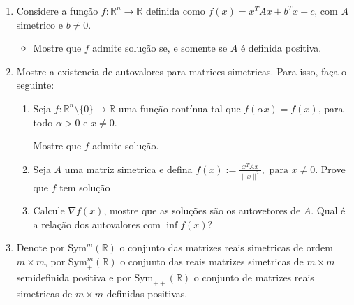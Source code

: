 \documentclass[a4paper,latin]{article}
\begin{document}
    \begin{enumerate}
    \item Considere a função 
    $f: \mathbb{R}^{n}\rightarrow \mathbb{R}$ definida como 
    $f(x)=x^{T}Ax+b^{T}x+c$, com  $A$ simetrico e $b\neq 0$.
      \begin{itemize}
      \item  
      Mostre que $f$ admite solução se, e 
      somente se $A$ é definida positiva. 
      \end{itemize}
    \item Mostre a existencia de autovalores para matrices simetricas.
    Para isso, faça o seguinte:
      \begin{enumerate}
      \item 
      Seja $f: 
      \mathbb{R}^{n}
      \setminus\{0\}   
      \rightarrow \mathbb{R}$ 
      uma função contínua tal 
      que $f(\alpha x)=f(x)$, para 
      todo $\alpha>0$ e $x \neq 0$.
      
      Mostre que $f$ admite solução.
      \item Seja $A$ uma matriz simetrica e defina $f(x):= \frac{x^{T}Ax}{\|x\|^{2}}, \text{ para } x \neq 0$.
      Prove que $f$ tem solução
      \item Calcule $\nabla f(x)$, 
      mostre que as soluções 
      são os autovetores de $A$.
      Qual é a relação dos 
      autovalores com $\inf f(x)$? 
      \end{enumerate} 
    \item Denote por 
    $\text{Sym}^{m}(\mathbb{R})$
    o conjunto das matrizes reais simetricas de ordem $m \times m$, por $\text{Sym}^{m}_{+}(\mathbb{R})$ o conjunto das reais matrizes simetricas de 
    $m\times m$ semidefinida positiva e por 
    $\text{Sym}_{++}(\mathbb{R})$ o conjunto de matrizes reais simetricas de 
    $m \times m$ definidas positivas.
    

\end{enumerate}
\end{document}
